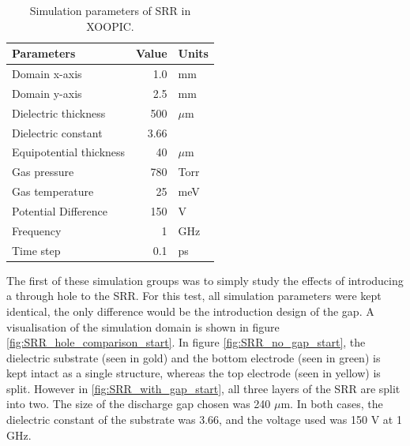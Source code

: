 \begin{table}[h!]
	\caption{Simulation parameters of SRR in XOOPIC.}
	\vspace{3 pt}
	\centering
	\begin{tabular}{l r l}
		Parameters               & Value    & Units  \\
		\hline 
		Domain x-axis            & 1.0      & mm     \\
		Domain y-axis            & 2.5  	& mm     \\
		Dielectric thickness     & 500      & $\mu$m \\
		Dielectric constant      & 3.66     &        \\
		Equipotential thickness  & 40       & $\mu$m \\
		Gas pressure             & 780      & Torr   \\
		Gas temperature          & 25       & meV    \\
		Potential Difference     & 150      & V      \\
		Frequency                & 1        & GHz    \\
		Time step                & 0.1      & ps
	\end{tabular}
	\label{tb:basic_simulation_parameters}
\end{table}

The first of these simulation groups was to simply study the effects of introducing a through hole to the SRR. For this test, all simulation parameters were kept identical, the only difference would be the introduction design of the gap. A visualisation of the simulation domain is shown in figure \ref{fig:SRR_hole_comparison_start}. In figure \ref{fig:SRR_no_gap_start}, the dielectric substrate (seen in gold) and the bottom electrode (seen in green) is kept intact as a single structure, whereas the top electrode (seen in yellow) is split. However in \ref{fig:SRR_with_gap_start}, all three layers of the SRR are split into two. The size of the discharge gap chosen was 240 $\mu$m. In both cases, the dielectric constant of the substrate was 3.66, and the voltage used was 150 V at 1 GHz. 

